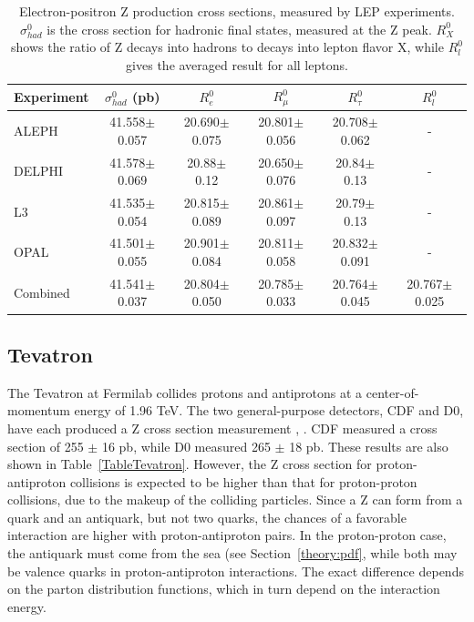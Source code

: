\begin{table}[htbp]
  \begin{center}
    \caption[Electron-positron Z production cross sections, 
      measured by LEP experiments]
	    {Electron-positron Z production cross sections, 
	      measured by LEP experiments. 
	      $\sigma_{had}^0$ is the cross section for hadronic 
	      final states, measured at the Z peak. 
	      $R_X^0$ shows the ratio of Z decays into hadrons 
	      to decays into lepton flavor X, 
	      while $R_l^0$ gives the averaged result for all leptons.  
	    }
    \label{TableLep}
    \begin{tabular}[]{ | l | c | c | c | c | c |}
      \hline
      Experiment & $\sigma_{had}^0 $ (pb) & $R_e^0$ & $R_{\mu}^0$ & $R_{\tau}^0$ & $R_l^0$ \\ \hline \hline
      ALEPH & 41.558$\pm$0.057 & 20.690$\pm$0.075 & 20.801$\pm$0.056 & 20.708$\pm$0.062 & - \\ \hline
      DELPHI & 41.578$\pm$0.069 & 20.88$\pm$0.12 & 20.650$\pm$0.076 & 20.84$\pm$0.13 & - \\ \hline
      L3 & 41.535$\pm$0.054 & 20.815$\pm$0.089 & 20.861$\pm$0.097 & 20.79$\pm$0.13 & - \\ \hline
      OPAL & 41.501$\pm$0.055 & 20.901$\pm$0.084 & 20.811$\pm$0.058 & 20.832$\pm$0.091 & - \\ \hline
      Combined & 41.541$\pm$0.037 & 20.804$\pm$0.050 & 20.785$\pm$0.033 & 20.764$\pm$0.045 & 20.767$\pm$0.025\\ \hline
    \end{tabular}
  \end{center}
\end{table}



\subsection{Tevatron}
\label{theory:tevatraon}

The Tevatron at Fermilab collides protons and antiprotons 
at a center-of-momentum energy of 1.96 TeV.  
The two general-purpose detectors, CDF and D0, 
have each produced a Z cross section measurement
\cite{Z-CDF}, 
\cite{Z-D0}.  
CDF measured a cross section of 255 $\pm$ 16 pb, 
while D0 measured 265 $\pm$ 18 pb.  
These results are also shown in 
Table~\ref{TableTevatron}.  
However, the Z cross section for proton-antiproton collisions 
is expected to be higher than that for proton-proton collisions, 
due to the makeup of the 
colliding particles.  
Since a Z can form from a quark and an antiquark, 
but not two quarks, the chances of a favorable 
interaction are higher with proton-antiproton pairs.  
In the proton-proton case, the antiquark must come from the sea 
(see Section~\ref{theory:pdf}, 
while both may be valence quarks in proton-antiproton interactions.  
The exact difference depends on the parton 
distribution functions, 
which in turn depend on the interaction energy.  

